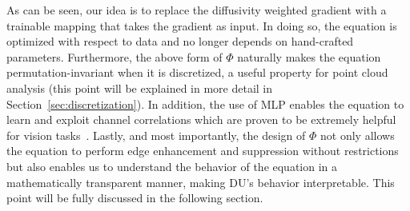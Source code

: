 \documentclass[a4paper,fleqn]{cas-dc}
\begin{document}
As can be seen, our idea is to replace the diffusivity weighted gradient with a trainable mapping that takes the gradient as input. In doing so, the equation is optimized with respect to data and no longer depends on hand-crafted parameters. Furthermore, the above form of $\Phi$ naturally makes the equation permutation-invariant when it is discretized, a useful property for point cloud analysis (this point will be explained in more detail in Section~\ref{sec:discretization}). In addition, the use of MLP enables the equation to learn and exploit channel correlations which are proven to be extremely helpful for vision tasks~\cite{hu2018squeeze}. Lastly, and most importantly, the design of $\Phi$ not only allows the equation to perform edge enhancement and suppression without restrictions but also enables us to understand the behavior of the equation in a mathematically transparent manner, making DU's behavior interpretable. This point will be fully discussed in the following section.         
\end{document}
